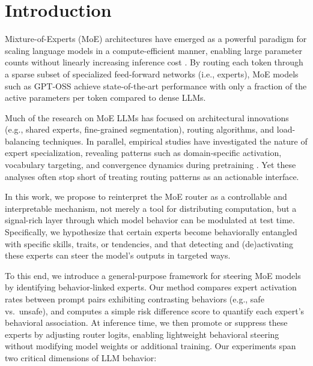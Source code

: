\documentclass{article} %
\begin{document}
\section{Introduction}
Mixture-of-Experts (MoE) architectures have emerged as a powerful paradigm for scaling language models in a compute-efficient manner, enabling large parameter counts without linearly increasing inference cost \citep{shazeer2017outrageously, lepikhin2021gshard, OpenMoE}. By routing each token through a sparse subset of specialized feed-forward networks (i.e., experts), MoE models such as GPT-OSS \citep{openai2025gptoss120bgptoss20bmodel, yang2025qwen3technicalreport, muennighoff2025olmoeopenmixtureofexpertslanguage} achieve state-of-the-art performance with only a fraction of the active parameters per token compared to dense LLMs.

Much of the research on MoE LLMs has focused on architectural innovations (e.g., shared experts, fine-grained segmentation), routing algorithms, and load-balancing techniques. In parallel, empirical studies have investigated the nature of expert specialization, revealing patterns such as domain-specific activation, vocabulary targeting, and convergence dynamics during pretraining \citep{jiang2024mixtralexperts, muennighoff2025olmoeopenmixtureofexpertslanguage, lo-etal-2025-closer, Cai_2025_survey}. Yet these analyses often stop short of treating routing patterns as an actionable interface.

In this work, we propose to reinterpret the MoE router as a controllable and interpretable mechanism, not merely a tool for distributing computation, but a signal-rich layer through which model behavior can be modulated at test time. Specifically, we hypothesize that certain experts become behaviorally entangled with specific skills, traits, or tendencies, and that detecting and (de)activating these experts can steer the model's outputs in targeted ways.

To this end, we introduce a general-purpose framework for steering MoE models by identifying behavior-linked experts. Our method compares expert activation rates between prompt pairs exhibiting contrasting behaviors (e.g., safe vs.\ unsafe), and computes a simple risk difference score to quantify each expert's behavioral association. At inference time, we then promote or suppress these experts by adjusting router logits, enabling lightweight behavioral steering without modifying model weights or additional training.
Our experiments span two critical dimensions of LLM behavior:
\end{document}
